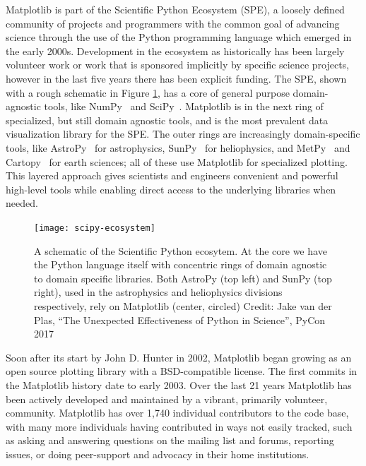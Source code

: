 \documentclass[12pt]{article}
\numberwithin{page}{section}
\begin{document}
Matplotlib is part of the Scientific Python Ecosystem (SPE), a loosely defined
community of projects and programmers with the common goal of advancing science
through the use of the Python programming language which emerged in the early
2000s.  Development in the ecosystem as historically has been largely volunteer
work or work that is sponsored implicitly by specific science projects, however
in the last five years there has been explicit funding.  The SPE, shown with a
rough schematic in Figure \ref{fig:ecosystem}, has a core of general purpose
domain-agnostic tools, like NumPy~\cite{Harris2020} and
SciPy~\cite{Virtanen2020}.  Matplotlib is in the next ring of specialized, but
still domain agnostic tools, and is the most prevalent data visualization
library for the SPE.  The outer rings are increasingly domain-specific tools,
like AstroPy~\cite{astropy:2013, astropy:2018} for astrophysics,
SunPy~\cite{sunpy_community2020} for heliophysics, and MetPy~\cite{metpy} and
Cartopy~\cite{Cartopy} for earth sciences; all of these use Matplotlib for
specialized plotting.
This layered approach gives scientists and engineers
convenient and powerful high-level tools while enabling direct access to the
underlying libraries when needed.


\begin{figure}
  \texttt{[image: scipy-ecosystem]}
  \caption{\small A schematic of the Scientific Python ecosytem.  At the
    core we have the Python language itself with concentric rings of
    domain agnostic to domain specific libraries.  Both AstroPy (top
    left) and SunPy (top right), used in the astrophysics and
    heliophysics divisions respectively, rely on Matplotlib (center, circled)
    Credit: Jake van der Plas, ``The Unexpected Effectiveness of Python
    in Science'', PyCon 2017}
  \label{fig:ecosystem}
\end{figure}


Soon after its start by John D. Hunter in 2002, Matplotlib began growing as an
open source plotting library with a BSD-compatible license. The first commits
in the Matplotlib history date to early 2003.  Over the last 21 years
Matplotlib has been actively developed and maintained by a vibrant, primarily
volunteer, community.  Matplotlib has over 1,740 individual contributors to the
code base, with many more individuals having contributed in ways not easily
tracked, such as asking and answering questions on the mailing list and forums,
reporting issues, or doing peer-support and advocacy in their home
institutions.
\end{document}
